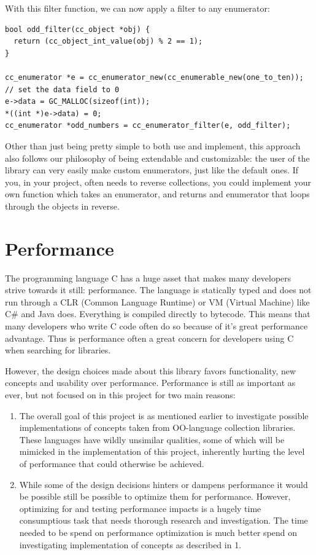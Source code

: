\documentclass[table]{ituthesis}
\begin{document}
	With this filter function, we can now apply a filter to any enumerator:

\begin{lstlisting}[label=cc_enumerator-custom-filter,caption=Custom filter example]
bool odd_filter(cc_object *obj) {
  return (cc_object_int_value(obj) % 2 == 1);
}

cc_enumerator *e = cc_enumerator_new(cc_enumerable_new(one_to_ten));
// set the data field to 0
e->data = GC_MALLOC(sizeof(int));
*((int *)e->data) = 0;
cc_enumerator *odd_numbers = cc_enumerator_filter(e, odd_filter);
\end{lstlisting}	

	Other than just being pretty simple to both use and implement, this approach also follows our philosophy of being extendable and customizable: the user of the library can very easily make custom enumerators, just like the default ones. If you, in your project, often needs to reverse collections, you could implement your own function which takes an enumerator, and returns and enumerator that loops through the objects in reverse.
	

\section{Performance}

The programming language C has a huge asset that makes many developers strive towards it still: performance. The language is statically typed and does not run through a CLR (Common Language Runtime) or VM (Virtual Machine) like C\# and Java does. Everything is compiled directly to bytecode. This means that many developers who write C code often do so because of it's great performance advantage. Thus is performance often a great concern for developers using C when searching for libraries. 

However, the design choices made about this library favors functionality, new concepts and usability over performance. Performance is still as important as ever, but not focused on in this project for two main reasons:

\begin{enumerate}
	\item The overall goal of this project is as mentioned earlier to investigate possible implementations of concepts taken from OO-language collection libraries. These languages have wildly unsimilar qualities, some of which will be mimicked in the implementation of this project, inherently hurting the level of performance that could otherwise be achieved.
	\item While some of the design decisions hinters or dampens performance it would be possible still be possible to optimize them for performance. However, optimizing for and testing performance impacts is a hugely time consumptious task that needs thorough research and investigation. The time needed to be spend on performance optimization is much better spend on investigating implementation of concepts as described in 1.
\end{enumerate}
\end{document}
